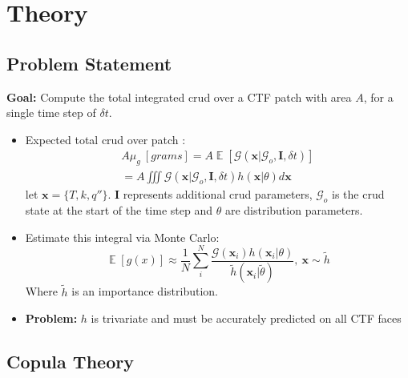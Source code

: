 \documentclass[t, pdftex]{beamer}
\DeclareMathOperator*{\E}{\mathbb{E}}
\begin{document}
\section[Theory]{Theory}
\subsection*{Problem Statement}
\begin{frame}
\textbf{Goal:} Compute the total integrated crud over a CTF patch with area $A$, for a single time step of $\delta t$.
\begin{itemize}
	\item Expected total crud over patch : 
	\begin{eqnarray}
		A \mu_g\ [grams] = A \E[\mathcal G(\mathbf x|\mathcal G_o, \mathbf I, \delta t)] \nonumber \\
		= A \iiint \mathcal G(\mathbf x|\mathcal G_o, \mathbf I, \delta t) h(\mathbf x|\theta) d \mathbf x  \nonumber
	\end{eqnarray}
	let $\mathbf x= \{T, k, q''\}$.
	$\mathbf I$ represents additional crud parameters, $\mathcal G_o$ is the crud state at the start of the time step and $\theta$ are distribution parameters.
	\item Estimate this integral via Monte Carlo:
	\[
	\E[g(x)] \approx \frac{1}{N} \sum_i^N \frac{\mathcal G(\mathbf x_i) 
	h(\mathbf x_i | \theta)}{\tilde h(\mathbf x_i | \tilde \theta)}, \ \mathbf x \sim \tilde h
	\]
	Where $\tilde h$ is an importance distribution. 
    \item \textbf{Problem:} $h$ is trivariate and must be accurately predicted on all CTF faces
\end{itemize}
\end{frame}


\subsection*{Copula Theory}
\end{document}
